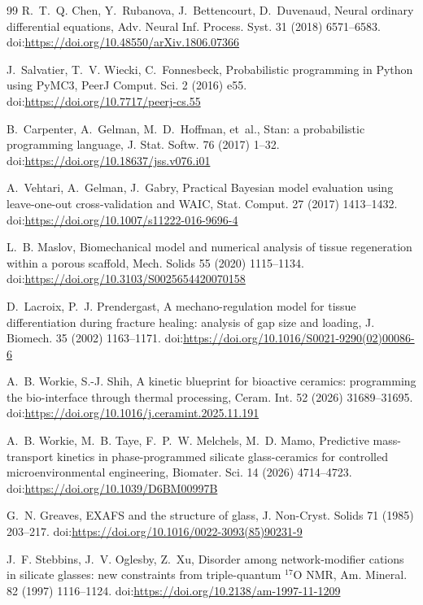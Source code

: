 \documentclass[11pt]{article}
\begin{document}
\begin{thebibliography}{99}
R.~T.~Q. Chen, Y.~Rubanova, J.~Bettencourt, D.~Duvenaud, Neural ordinary differential equations, Adv. Neural Inf. Process. Syst. 31 (2018) 6571--6583.
\newblock doi:\url{https://doi.org/10.48550/arXiv.1806.07366}


J.~Salvatier, T.~V. Wiecki, C.~Fonnesbeck, Probabilistic programming in Python using PyMC3, PeerJ Comput. Sci. 2 (2016) e55.
\newblock doi:\url{https://doi.org/10.7717/peerj-cs.55}


B.~Carpenter, A.~Gelman, M.~D.~Hoffman, et~al., Stan: a probabilistic programming language, J. Stat. Softw. 76 (2017) 1--32.
\newblock doi:\url{https://doi.org/10.18637/jss.v076.i01}


A.~Vehtari, A.~Gelman, J.~Gabry, Practical Bayesian model evaluation using leave-one-out cross-validation and WAIC, Stat. Comput. 27 (2017) 1413--1432.
\newblock doi:\url{https://doi.org/10.1007/s11222-016-9696-4}


L.~B. Maslov, Biomechanical model and numerical analysis of tissue regeneration within a porous scaffold, Mech. Solids 55 (2020) 1115--1134.
\newblock doi:\url{https://doi.org/10.3103/S0025654420070158}


D.~Lacroix, P.~J. Prendergast, A mechano-regulation model for tissue differentiation during fracture healing: analysis of gap size and loading, J. Biomech. 35 (2002) 1163--1171.
\newblock doi:\url{https://doi.org/10.1016/S0021-9290(02)00086-6}


A.~B. Workie, S.-J. Shih, A kinetic blueprint for bioactive ceramics: programming the bio-interface through thermal processing, Ceram. Int. 52 (2026) 31689--31695.
\newblock doi:\url{https://doi.org/10.1016/j.ceramint.2025.11.191}


A.~B. Workie, M.~B. Taye, F.~P.~W. Melchels, M.~D. Mamo, Predictive mass-transport kinetics in phase-programmed silicate glass-ceramics for controlled microenvironmental engineering, Biomater. Sci. 14 (2026) 4714--4723.
\newblock doi:\url{https://doi.org/10.1039/D6BM00997B}


G.~N. Greaves, EXAFS and the structure of glass, J. Non-Cryst. Solids 71 (1985) 203--217.
\newblock doi:\url{https://doi.org/10.1016/0022-3093(85)90231-9}


J.~F. Stebbins, J.~V. Oglesby, Z.~Xu, Disorder among network-modifier cations in silicate glasses: new constraints from triple-quantum $^{17}$O NMR, Am. Mineral. 82 (1997) 1116--1124.
\newblock doi:\url{https://doi.org/10.2138/am-1997-11-1209}



\end{thebibliography}
\end{document}
